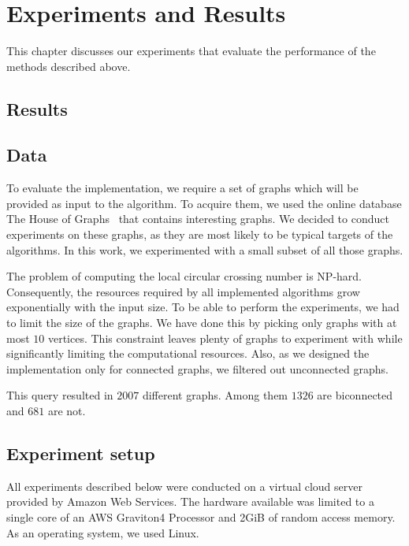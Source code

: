 \chapter{Experiments and Results}\label{ch:experiments-and-results}

This chapter discusses our experiments that evaluate the performance of the methods described above.

\section{Results}

\section{Data}

To evaluate the implementation, we require a set of graphs which will be provided as input to the algorithm. To acquire them, we used the online database The House of Graphs~\cite{HoG} that contains interesting graphs. We decided to conduct experiments on these graphs, as they are most likely to be typical targets of the algorithms. In this work, we experimented with a small subset of all those graphs.

The problem of computing the local circular crossing number is NP-hard. Consequently, the resources required by all implemented algorithms grow exponentially with the input size. To be able to perform the experiments, we had to limit the size of the graphs. We have done this by picking only graphs with at most \(10\) vertices. This constraint leaves plenty of graphs to experiment with while significantly limiting the computational resources. Also, as we designed the implementation only for connected graphs, we filtered out unconnected graphs.

This query resulted in \(2007\) different graphs. Among them \(1326\) are biconnected and \(681\) are not.


\section{Experiment setup}

All experiments described below were conducted on a virtual cloud server provided by Amazon Web Services. The hardware available was limited to a single core of an AWS Graviton4 Processor and 2GiB of random access memory. As an operating system, we used Linux.

